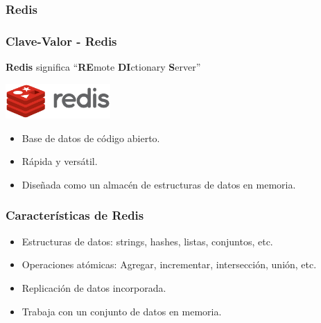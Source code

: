 \subsubsection{Redis}

\begin{frame}   
    \frametitle{Clave-Valor - Redis}

    \textbf{Redis} significa ``\textbf{RE}mote \textbf{DI}ctionary \textbf{S}erver''

    \begin{center}
        \includegraphics[width=0.3\textwidth]{images/redis_logo.png}
    \end{center}
    
     

    \begin{itemize}
        \item Base de datos de código abierto.  
        \item Rápida y versátil.  
        \item Diseñada como un almacén de estructuras de datos en memoria.
    \end{itemize}

\end{frame}

\begin{frame}
    \frametitle{Características de Redis}

    \begin{itemize}
        \item Estructuras de datos: strings, hashes, listas, conjuntos, etc.  
        \item Operaciones atómicas: Agregar, incrementar, intersección, unión, etc.  
        \item Replicación de datos incorporada.  
        \item Trabaja con un conjunto de datos en memoria.
    \end{itemize}
\end{frame}

